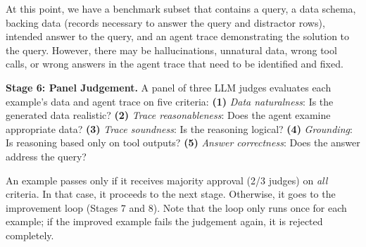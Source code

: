 \documentclass[11pt]{article}
\begin{document}
At this point, we have a benchmark subset that contains a query, a data schema, backing data (records necessary to answer the query and distractor rows), intended answer to the query, and  an agent trace demonstrating the solution to the query.
However, there may be hallucinations, unnatural data, wrong tool calls, or wrong answers in the agent trace that need to be identified and fixed.

\noindent \textbf{Stage 6: Panel Judgement.}
A 
panel
of three LLM judges evaluates each example's data and agent trace on five criteria: 
\textbf{(1)} \emph{Data naturalness}: Is the generated data realistic?
\textbf{(2)} \emph{Trace reasonableness}: Does the agent examine appropriate data?
\textbf{(3)} \emph{Trace soundness}: Is the reasoning logical?
\textbf{(4)} \emph{Grounding}: Is reasoning based only on tool outputs?
\textbf{(5)} \emph{Answer correctness}: Does the answer address the query?


An example passes only if it receives majority approval (2/3 judges) on \emph{all} criteria. In that case, it proceeds to the next stage. Otherwise, it goes to the improvement loop (Stages 7 and 8). Note that the loop only runs once for each example; if the improved example fails the judgement again, it is rejected completely.
\end{document}
